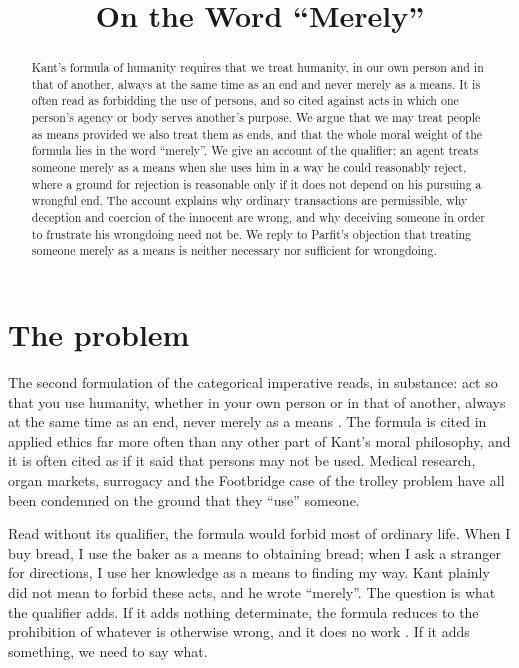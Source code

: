 \documentclass{situationist-preprint}
\title{On the Word \enquote{Merely}}
\begin{document}
\maketitle

\begin{abstract}
Kant's formula of humanity requires that we treat humanity, in our own person and in that of another, always at the same time as an end and never merely as a means. It is often read as forbidding the use of persons, and so cited against acts in which one person's agency or body serves another's purpose. We argue that we may treat people as means provided we also treat them as ends, and that the whole moral weight of the formula lies in the word \enquote{merely}. We give an account of the qualifier: an agent treats someone merely as a means when she uses him in a way he could reasonably reject, where a ground for rejection is reasonable only if it does not depend on his pursuing a wrongful end. The account explains why ordinary transactions are permissible, why deception and coercion of the innocent are wrong, and why deceiving someone in order to frustrate his wrongdoing need not be. We reply to Parfit's objection that treating someone merely as a means is neither necessary nor sufficient for wrongdoing.
\end{abstract}

\section{The problem}

The second formulation of the categorical imperative reads, in substance: act so that you use humanity, whether in your own person or in that of another, always at the same time as an end, never merely as a means \citep[4:429]{Kant1785}. The formula is cited in applied ethics far more often than any other part of Kant's moral philosophy, and it is often cited as if it said that persons may not be used. Medical research, organ markets, surrogacy and the Footbridge case of the trolley problem have all been condemned on the ground that they \enquote{use} someone.

Read without its qualifier, the formula would forbid most of ordinary life. When I buy bread, I use the baker as a means to obtaining bread; when I ask a stranger for directions, I use her knowledge as a means to finding my way. Kant plainly did not mean to forbid these acts, and he wrote \enquote{merely}. The question is what the qualifier adds. If it adds nothing determinate, the formula reduces to the prohibition of whatever is otherwise wrong, and it does no work \citep{Parfit2011}. If it adds something, we need to say what.
\end{document}
